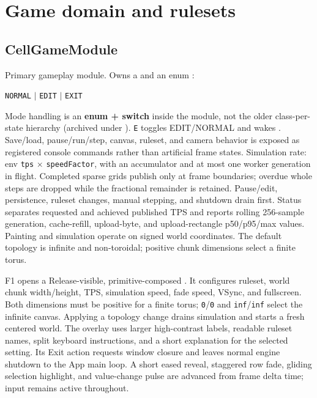 \section{Game domain and rulesets}
\label{sec:game}

\subsection{CellGameModule}
Primary gameplay module. Owns a  and an enum
:
\begin{center}
\texttt{NORMAL} $\mid$ \texttt{EDIT} $\mid$ \texttt{EXIT}
\end{center}

\begin{statusbox}
Mode handling is an \textbf{enum + switch} inside the module, not the older
class-per-state hierarchy (archived under ).
\texttt{E} toggles EDIT/NORMAL and wakes .
Save/load, pause/run/step, canvas, ruleset, and camera behavior is exposed as
registered console commands rather than artificial frame states.
Simulation rate: env \texttt{tps} $\times$ \texttt{speedFactor}, with an
accumulator and at most one worker generation in flight. Completed sparse grids
publish only at frame boundaries; overdue whole steps are dropped while the
fractional remainder is retained. Pause/edit, persistence, ruleset changes,
manual stepping, and shutdown drain first. Status separates requested and
achieved published TPS and reports rolling 256-sample generation, cache-refill,
upload-byte, and upload-rectangle p50/p95/max values. Painting and simulation
operate on signed world coordinates. The default topology is infinite and
non-toroidal; positive chunk dimensions select a finite torus.
\end{statusbox}

F1 opens a Release-visible, primitive-composed .
It configures ruleset, world chunk width/height, TPS, simulation speed, fade
speed, VSync, and fullscreen. Both dimensions must be positive for a finite
torus; \texttt{0}/\texttt{0} and \texttt{inf}/\texttt{inf} select the infinite
canvas. Applying a topology change drains simulation and starts a fresh
centered world. The overlay uses larger high-contrast labels, readable ruleset
names, split keyboard instructions, and a short explanation for the selected
setting. Its Exit action requests window closure and leaves normal engine
shutdown to the App main loop. A short eased reveal, staggered row fade, gliding
selection highlight, and value-change pulse are advanced from frame delta time;
input remains active throughout.


